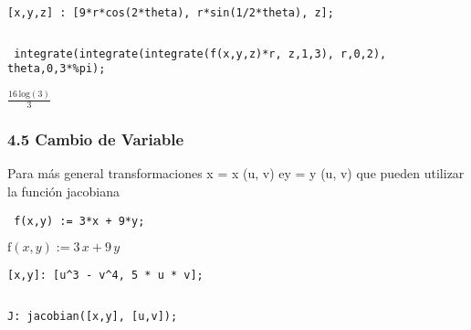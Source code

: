 \documentclass[12pt]{article}
\begin{document}
\noindent

\begin{verbatim}
[x,y,z] : [9*r*cos(2*theta), r*sin(1/2*theta), z];
\end{verbatim}


\begin{math}
[9\,r\,\mathrm{cos}\left( 2\,\theta\right) ,r\,\mathrm{sin}\left( \frac{\theta}{2}\right) ,z]
\end{math}


\noindent

\begin{verbatim}
 integrate(integrate(integrate(f(x,y,z)*r, z,1,3), r,0,2), theta,0,3*%pi);
\end{verbatim}


\begin{math}
\frac{16\,\mathrm{log}\left( 3\right) }{3}
\end{math}


\subsubsection*{4.5 Cambio de Variable}
Para más general transformaciones x = x (u, v) ey = y (u, v) que pueden utilizar la función jacobiana

\noindent
\begin{verbatim}
 f(x,y) := 3*x + 9*y;
\end{verbatim}

\begin{math}
\mathrm{f}\left( x,y\right) :=3\,x+9\,y
\end{math}


\noindent

\begin{verbatim}
[x,y]: [u^3 - v^4, 5 * u * v];
\end{verbatim}


\begin{math}
[{u}^{3}-{v}^{4},5\,u\,v]
\end{math}


\noindent

\begin{verbatim}
J: jacobian([x,y], [u,v]);
\end{verbatim}
\end{document}
